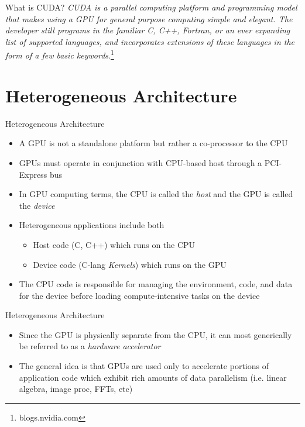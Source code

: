 \documentclass[handout]{beamer}
\begin{document}
\begin{frame}{What is CUDA?}
\emph{CUDA is a parallel computing platform and programming model that makes using a GPU for general purpose computing simple and elegant. The developer still programs in the familiar C, C++, Fortran, or an ever expanding list of supported languages, and incorporates extensions of these languages in the form of a few basic keywords}.\footnote{blogs.nvidia.com}
\end{frame}

\section{Heterogeneous Architecture}  
\begin{frame}{Heterogeneous Architecture}
\begin{itemize}
  \item<1-> A GPU is not a standalone platform but rather a co-processor to the CPU
  \item<2-> GPUs must operate in conjunction with CPU-based host through a PCI-Express bus
  \item<3-> In GPU computing terms, the CPU is called the \emph{host} and the GPU is called the \emph{device}
  \item<4->Heterogeneous applications include both 
  	\begin{itemize}
  		\item {Host code (C, C++) which runs on the CPU}
		\item {Device code (C-lang \emph{Kernels}) which runs on the GPU}
  	\end{itemize}
  \item<5->The CPU code is responsible for managing the environment, code, and data for the device before loading compute-intensive tasks on the device	
\end{itemize}
\end{frame}

\begin{frame}{Heterogeneous Architecture}
\begin{itemize}
\itemsep1em
	\item<1-> Since the GPU is physically separate from the CPU, it can most generically be referred to as a \emph{hardware accelerator}
	\item<2->The general idea is that GPUs are used only to accelerate portions of application code which exhibit rich amounts of data parallelism (i.e. linear algebra, image proc, FFTs, etc)
\end{itemize}
\end{frame}
\end{document}
